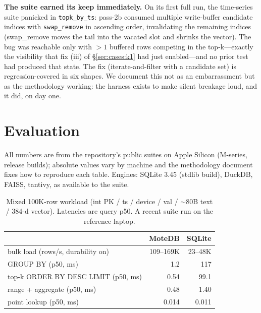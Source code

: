 \documentclass[10pt]{article}
\begin{document}
\textbf{The suite earned its keep immediately.} On its first full run, the
time-series suite panicked in \texttt{topk\_by\_ts}: pass-2b consumed
multiple write-buffer candidate indices with \texttt{swap\_remove} in
ascending order, invalidating the remaining indices (swap\_remove moves the
tail into the vacated slot and shrinks the vector). The bug was reachable
only with $>1$ buffered rows competing in the top-k---exactly the
visibility that fix (iii) of \S\ref{sec:cases:k1} had just enabled---and no
prior test had produced that state. The fix (iterate-and-filter with a
candidate set) is regression-covered in six shapes. We document this not as
an embarrassment but as the methodology working: the harness exists to make
silent breakage loud, and it did, on day one.

\section{Evaluation}
\label{sec:eval}

All numbers are from the repository's public suites on Apple Silicon
(M-series, release builds); absolute values vary by machine and the
methodology document fixes how to reproduce each table. Engines: SQLite
3.45 (stdlib build), DuckDB, FAISS, tantivy, as available to the suite.

\begin{table}[h]
\centering\small
\caption{Mixed 100K-row workload (int PK / ts / device / val / $\sim$80B
text / 384-d vector). Latencies are query p50. A recent suite run on the
reference laptop.}
\begin{tabular}{lrr}
\toprule
 & MoteDB & SQLite \\
\midrule
bulk load (rows/s, durability on) & 109--169K & 23--48K \\
GROUP BY (p50, ms) & 1.2 & 117 \\
top-k ORDER BY DESC LIMIT (p50, ms) & 0.54 & 99.1 \\
range + aggregate (p50, ms) & 0.48 & 1.40 \\
point lookup (p50, ms) & 0.014 & 0.011 \\
\bottomrule
\end{tabular}
\end{table}
\end{document}
